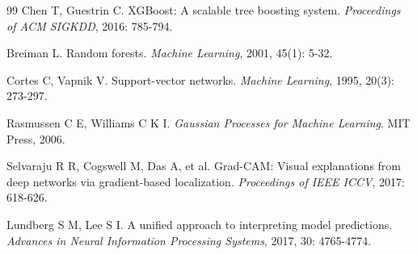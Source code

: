 \documentclass[12pt,a4paper]{article}
\numberwithin{figure}{section}
\numberwithin{table}{section}
\numberwithin{equation}{section}
\begin{document}
\begin{thebibliography}{99}
Chen T, Guestrin C. XGBoost: A scalable tree boosting system. \textit{Proceedings of ACM SIGKDD}, 2016: 785-794.

Breiman L. Random forests. \textit{Machine Learning}, 2001, 45(1): 5-32.

Cortes C, Vapnik V. Support-vector networks. \textit{Machine Learning}, 1995, 20(3): 273-297.

Rasmussen C E, Williams C K I. \textit{Gaussian Processes for Machine Learning}. MIT Press, 2006.

Selvaraju R R, Cogswell M, Das A, et al. Grad-CAM: Visual explanations from deep networks via gradient-based localization. \textit{Proceedings of IEEE ICCV}, 2017: 618-626.

Lundberg S M, Lee S I. A unified approach to interpreting model predictions. \textit{Advances in Neural Information Processing Systems}, 2017, 30: 4765-4774.

\end{thebibliography}
\end{document}

